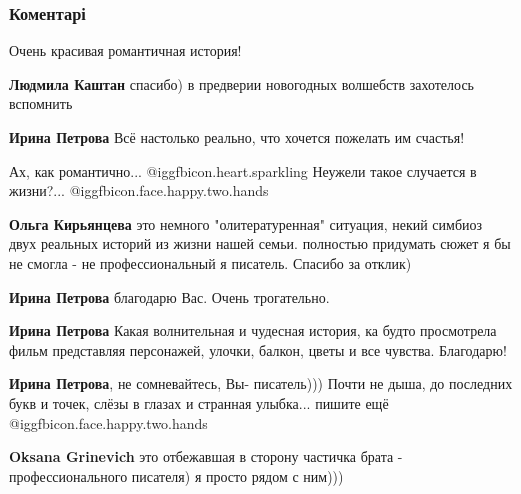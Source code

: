  
 
 
 
 
\subsubsection{Коментарі}

\begin{itemize} %
Очень красивая романтичная история!

\begin{itemize} %
\textbf{Людмила Каштан} спасибо) в предверии новогодных волшебств захотелось вспомнить

\textbf{Ирина Петрова} Всё настолько реально, что хочется пожелать им счастья!
\end{itemize} %

Ах, как романтично... @igg{fbicon.heart.sparkling} 
Неужели такое случается в жизни?... @igg{fbicon.face.happy.two.hands} 

\begin{itemize} %
\textbf{Ольга Кирьянцева} это немного "олитературенная" ситуация, некий симбиоз двух реальных историй из жизни нашей семьи. полностью придумать сюжет я бы не смогла - не профессиональный я писатель. Спасибо за отклик)

\textbf{Ирина Петрова} благодарю Вас. Очень трогательно.

\textbf{Ирина Петрова} Какая волнительная и чудесная история, ка будто просмотрела фильм представляя персонажей, улочки, балкон, цветы и все чувства. Благодарю!

\textbf{Ирина Петрова}, не сомневайтесь, Вы- писатель))) Почти не дыша, до последних букв и точек, слёзы в глазах и странная улыбка... пишите ещё @igg{fbicon.face.happy.two.hands} 

\textbf{Oksana Grinevich} это отбежавшая в сторону частичка брата - профессионального писателя) я просто рядом с ним)))

\end{itemize} %


\end{itemize}
